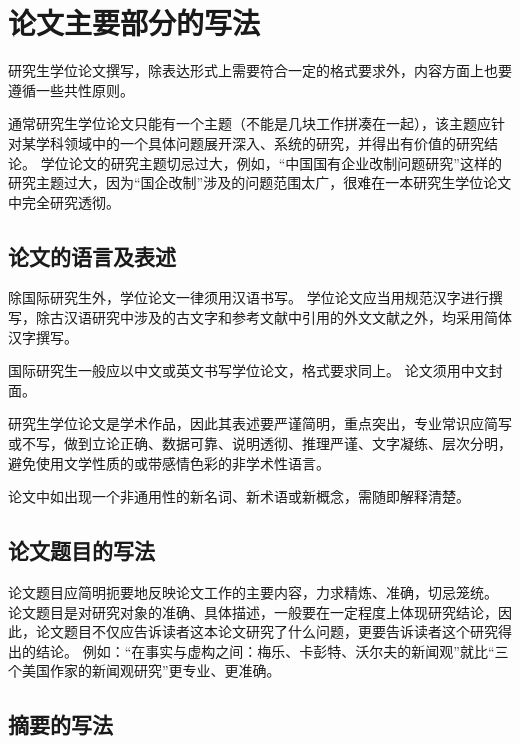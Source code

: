 
\chapter{论文主要部分的写法}

研究生学位论文撰写，除表达形式上需要符合一定的格式要求外，内容方面上也要遵循一些共性原则。

通常研究生学位论文只能有一个主题（不能是几块工作拼凑在一起），该主题应针对某学科领域中的一个具体问题展开深入、系统的研究，并得出有价值的研究结论。
学位论文的研究主题切忌过大，例如，“中国国有企业改制问题研究”这样的研究主题过大，因为“国企改制”涉及的问题范围太广，很难在一本研究生学位论文中完全研究透彻。



\section{论文的语言及表述}

除国际研究生外，学位论文一律须用汉语书写。
学位论文应当用规范汉字进行撰写，除古汉语研究中涉及的古文字和参考文献中引用的外文文献之外，均采用简体汉字撰写。

国际研究生一般应以中文或英文书写学位论文，格式要求同上。
论文须用中文封面。

研究生学位论文是学术作品，因此其表述要严谨简明，重点突出，专业常识应简写或不写，做到立论正确、数据可靠、说明透彻、推理严谨、文字凝练、层次分明，避免使用文学性质的或带感情色彩的非学术性语言。

论文中如出现一个非通用性的新名词、新术语或新概念，需随即解释清楚。



\section{论文题目的写法}

论文题目应简明扼要地反映论文工作的主要内容，力求精炼、准确，切忌笼统。
论文题目是对研究对象的准确、具体描述，一般要在一定程度上体现研究结论，因此，论文题目不仅应告诉读者这本论文研究了什么问题，更要告诉读者这个研究得出的结论。
例如：“在事实与虚构之间：梅乐、卡彭特、沃尔夫的新闻观”就比“三个美国作家的新闻观研究”更专业、更准确。



\section{摘要的写法}

